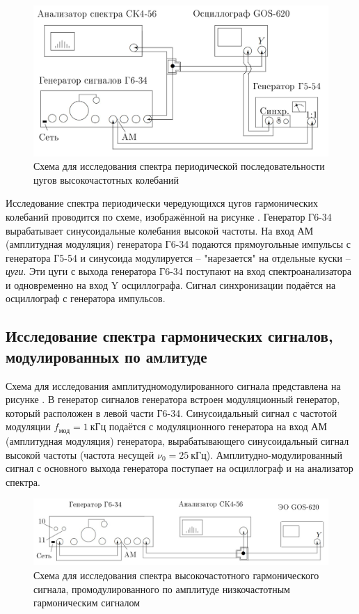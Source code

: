 \documentclass[a4paper,10pt]{article}
\begin{document}
\begin{figure}[h]
	\centering
	\includegraphics[scale=0.27]{Device_2}
	\caption{Схема для исследования спектра периодической последовательности цугов высокочастотных колебаний} \label{Device_2}
\end{figure}

Исследование спектра периодически чередующихся цугов гармонических колебаний проводится по схеме, изображённой на рисунке . Генератор Г6-34 вырабатывает синусоидальные колебания высокой частоты. На вход АМ (амплитудная модуляция) генератора Г6-34 подаются прямоугольные импульсы с генератора Г5-54 и синусоида модулируется -- "нарезается" на отдельные куски -- \textit{цуги}. Эти цуги с выхода генератора Г6-34 поступают на вход спектроанализатора и одновременно на вход Y осциллографа. Сигнал синхронизации подаётся на осциллограф с генератора импульсов.

\subsection*{Исследование спектра гармонических сигналов, модулированных по амлитуде}

Схема для исследования амплитудномодулированного сигнала представлена на рисунке . В генератор сигналов генератора встроен модуляционный генератор, который расположен в левой части Г6-34. Синусоидальный сигнал с частотой модуляции $f_{\text{мод}}=1~\text{кГц}$ подаётся с модуляционного генератора на вход АМ (амплитудная модуляция) генератора, вырабатывающего синусоидальный сигнал высокой частоты (частота несущей $\nu_0=25~\text{кГц}$). Амплитудно-модулированный сигнал с основного выхода генератора поступает на осциллограф и на анализатор спектра.

\begin{figure}[h]
	\centering
	\includegraphics[scale=0.27]{Device_3}
	\caption{Схема для исследования спектра высокочастотного гармонического сигнала, промодулированного по амплитуде низкочастотным гармоническим сигналом} \label{Device_3}
\end{figure}
\end{document}
